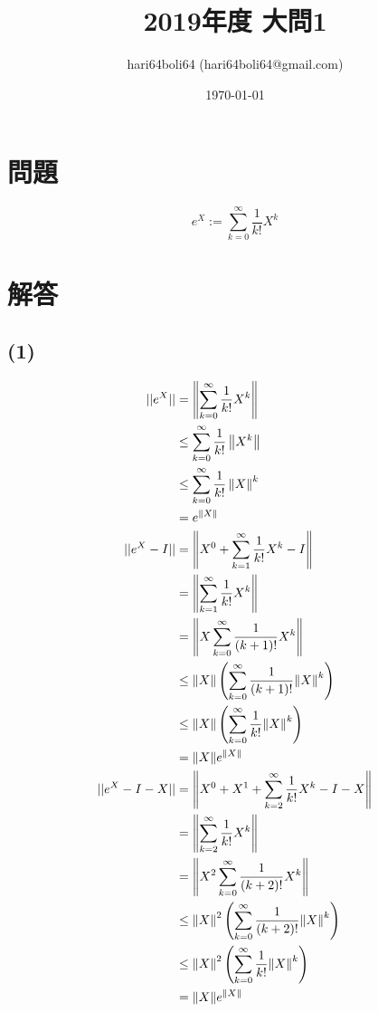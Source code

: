 \documentclass[a4paper, 10pt, dvipdfmx]{jlreq}
\begin{document}
\title{2019年度 大問1}
\author{hari64boli64 (hari64boli64@gmail.com)}
\date{\today}
\maketitle


\section{問題}

\begin{equation*}
  e^X:=\sum_{k=0}^\infty \frac{1}{k!}X^k
\end{equation*}

\section{解答}

\subsection*{(1)}

\begin{align*}
  ||e^X||     & =\left\lVert \sum_{k=0}^\infty \frac{1}{k!}X^k\right\rVert                    \\
              & \leq \sum_{k=0}^\infty \frac{1}{k!}\left\lVert X^k\right\rVert                \\
              & \leq \sum_{k=0}^\infty \frac{1}{k!}\left\lVert X\right\rVert^k                \\
              & =e^{\norm{X}}                                                                 \\
  ||e^X-I||   & =\left\lVert X^0+ \sum_{k=1}^\infty \frac{1}{k!}X^k -I\right\rVert            \\
              & =\left\lVert \sum_{k=1}^\infty \frac{1}{k!}X^k\right\rVert                    \\
              & =\left\lVert X\sum_{k=0}^\infty \frac{1}{(k+1)!}X^k\right\rVert               \\
              & \leq \norm{X}\left( \sum_{k=0}^{\infty} \frac{1}{(k+1)!} \norm{X}^k \right)   \\
              & \leq \norm{X}\left( \sum_{k=0}^{\infty} \frac{1}{k!} \norm{X}^k \right)       \\
              & =\norm{X}e^{\norm{X}}                                                         \\
  ||e^X-I-X|| & =\left\lVert X^0+X^1 +\sum_{k=2}^\infty \frac{1}{k!}X^k -I - X\right\rVert    \\
              & =\left\lVert \sum_{k=2}^\infty \frac{1}{k!}X^k\right\rVert                    \\
              & =\left\lVert X^2 \sum_{k=0}^\infty \frac{1}{(k+2)!}X^k\right\rVert            \\
              & \leq \norm{X}^2\left( \sum_{k=0}^{\infty} \frac{1}{(k+2)!} \norm{X}^k \right) \\
              & \leq \norm{X}^2\left( \sum_{k=0}^{\infty} \frac{1}{k!} \norm{X}^k \right)     \\
              & =\norm{X}e^{\norm{X}}
\end{align*}
\end{document}
